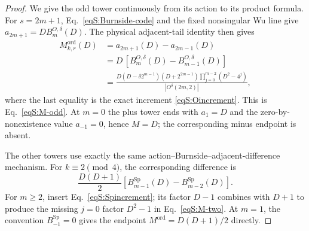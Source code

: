 \documentclass[journal,twocolumn]{IEEEtran}
\theoremstyle{definition}
\theoremstyle{plain}
\newcommand{\Ord}{\mathrm{ord}}
\newcommand{\Sp}{\operatorname{Sp}}
\begin{document}
\begin{proof}
We give the odd tower continuously from its action to its product formula.
For $s=2m+1$, Eq.~\eqref{eqS:Burnside-code} and the fixed nonsingular Wu line
give $a_{2m+1}=DB_m^{O,\delta}(D)$.  The physical adjacent-tail identity then
gives
\begin{equation}
 \begin{aligned}
 M^{\Ord}_{k,r}(D)
 &=a_{2m+1}(D)-a_{2m-1}(D)\\
 &=D\,[B_m^{O,\delta}(D)-B_{m-1}^{O,\delta}(D)]\\
 &=\frac{D(D-\delta2^{m-1})(D+2^{2m-1})
  \prod_{j=0}^{m-2}(D^2-4^j)}{|O^\delta(2m,2)|},
 \end{aligned}
\end{equation}
where the last equality is the exact increment
\eqref{eqS:Oincrement}.  This is Eq.~\eqref{eqS:M-odd}.  At $m=0$ the plus
tower ends with $a_1=D$ and the zero-by-nonexistence value $a_{-1}=0$, hence
$M=D$; the corresponding minus endpoint is absent.

The other towers use exactly the same action--Burnside--adjacent-difference
mechanism.  For $k\equiv2\pmod4$, the corresponding difference is
\begin{equation}
 \frac{D(D+1)}2[B_{m-1}^{\Sp}(D)-B_{m-2}^{\Sp}(D)].
\end{equation}
For $m\geq2$, insert Eq.~\eqref{eqS:Spincrement}; its factor $D-1$
combines with $D+1$ to produce the missing $j=0$ factor $D^2-1$ in
Eq.~\eqref{eqS:M-two}.  At $m=1$, the convention
$B_{-1}^{\Sp}=0$ gives the endpoint
$M^{\Ord}=D(D+1)/2$ directly.


\end{proof}
\end{document}
